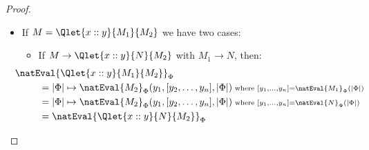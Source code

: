 \begin{proof}
\begin{itemize}
\begin{itemize}
            \item If $M\to R[k/M_1]\ :: \Qfor{k}{M_2}{R}$ with $M' = V::L$, then: 
            \begin{align*}
                &\hspace*{-25pt}\natEval{\Qfor{k}{M_1\ ::\ M_2}{R}}_\Phi \\
                &= |\Phi| \mapsto \bigtimes\limits_{k\in \natEval{M_1\ ::\ M_2}_\Phi(|\Phi|)} \natEval{R}_\Phi(k, |\Phi|)\\
                &= |\Phi| \mapsto \bigtimes\limits_{k\in \natEval{M_1}_\Phi(|\Phi|) \times \natEval{M_2}_\Phi(|\Phi|)} \natEval{R}_\Phi(k, |\Phi|)\\
                &= |\Phi| \mapsto \natEval{R}_{k,\Phi}(\natEval{M_1}_\Phi(|\Phi|), |\Phi|) \times \bigtimes\limits_{k\in \natEval{M_2}_\Phi(|\Phi|} \natEval{R}_{k,\Phi}(k, |\Phi|)\\
                &= \natEval{R[M_1/k]}_{\Phi} \times \natEval{\Qfor{k}{M_2}{R}}_\Phi\\
                &= \natEval{R[M_1/k]\ ::\ \Qfor{k}{M_2}{R}}_\Phi\\
            \end{align*}

            \item If $M\to \vnil$ with $M' = \vnil^\nat$, then: 
            \begin{align*}
                \natEval{\Qfor{k}{\vnil^\nat}{R}}_\Phi &= |\Phi| \mapsto \bigtimes\limits_{k\in \natEval{\vnil^\nat}_\Phi(|\Phi|)} \natEval{R}_\Phi(k, |\Phi|)\\
                &= |\Phi| \mapsto \bigtimes\limits_{k\in []} \natEval{R}_\Phi(k, |\Phi|)\\
                &= |\Phi| \mapsto []\\
                &= \natEval{\vnil^\nat}_\Phi
            \end{align*}
        \end{itemize}

        \item If $M = \Qlet{x::y}{M_1}{M_2}$ we have two cases:
        \begin{itemize}
            \item If $M\to \Qlet{x::y}{N}{M_2}$ with $M_1\to N$, then: 
            \begin{align*}
            &\hspace*{-25pt}\natEval{\Qlet{x::y}{M_1}{M_2}}_\Phi\\
            &= |\Phi|\mapsto \natEval{M_2}_\Phi(y_1,[y_2,\dots,y_n],|\Phi|){\scriptstyle{\text{ where } [y_1,\dots,y_n] = \natEval{M_1}_\Phi(|\Phi|)}}\\
            &= |\Phi|\mapsto 
            \natEval{M_2}_\Phi(y_1,[y_2,\dots,y_n],|\Phi|)
        {\scriptstyle{\text{ where } [y_1,\dots,y_n] = \natEval{N}_\Phi(|\Phi|)}}\\
            &= \natEval{\Qlet{x::y}{N}{M_2}}_\Phi
            \end{align*}


\end{itemize}
\end{itemize}
\end{proof}
